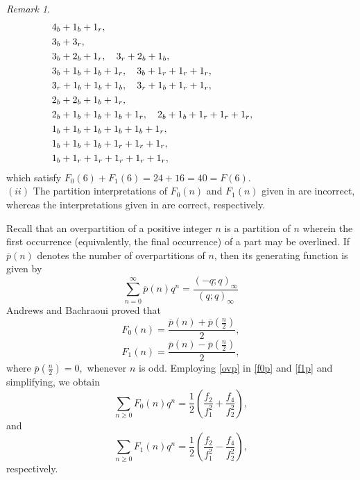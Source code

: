 \documentclass[12pt]{article}
\numberwithin{equation}{section}
\theoremstyle{definition}
\theoremstyle{remark}
\newtheorem{remark}[theorem]{Remark}
\numberwithin{equation}{section}
\begin{document}
\begin{remark}
\begin{align*}
	\hspace{-2.1cm}	&4_b+1_b+1_r,\\
	\hspace{-2.1cm}	&3_b+3_r,\\
	\hspace{-2.1cm}	&3_b+2_b+1_r,\quad 3_r+2_b+1_b,\\
	\hspace{-2.1cm}	&3_b+1_b+1_b+1_r,\quad 3_b+1_r+1_r+1_r,\\
	\hspace{-2.1cm}	&3_r+1_b+1_b+1_b,\quad 3_r+1_b+1_r+1_r, \\
	\hspace{-2.1cm}	&2_b+2_b+1_b+1_r,\\
	\hspace{-2.1cm}	&2_b+1_b+1_b+1_b+1_r,\quad
	2_b+1_b+1_r+1_r+1_r,\\
	\hspace{-2.1cm}	&1_b+1_b+1_b+1_b+1_b+1_r,\\
	\hspace{-2.1cm}	&1_b+1_b+1_b+1_r+1_r+1_r,\\
	\hspace{-2.1cm}	&1_b+1_r+1_r+1_r+1_r+1_r,
\end{align*}
which satisfy $F_0(6)+F_1(6)=24+16=40=F(6)$.\\

\noindent$(ii)$ The partition interpretations of \( F_0(n) \) and \( F_1(n) \) given in \cite[p.2, Corollary 1.4 and 1.6]{2clr} are incorrect, whereas the interpretations given in \cite[Corollary 1 and 2]{arx} are correct, respectively.
\end{remark}

Recall that  an overpartition of a positive integer $n$ is a partition of $n$ wherein  the first occurrence (equivalently, the final occurrence) of a part may be overlined.  If $\overline{p}(n)$ denotes the number of overpartitions of $n$, then its generating function \cite{cor} is given by 
\begin{equation}\label{ovp}
	\sum_{n=0}^{\infty}\overline{p}(n)q^n=\dfrac{(-q;q)_\infty}{(q;q)_\infty}
\end{equation}
Andrews and Bachraoui \cite[p.4, Theorem 2.1]{2clr}  proved that
\begin{equation}\label{f0p}
   F_0(n)=\dfrac{\overline{p}(n)+\overline{p}(\frac{n}{2})}{2},  
\end{equation}
\begin{equation}\label{f1p}
   F_1(n)=\dfrac{\overline{p}(n)-\overline{p}(\frac{n}{2})}{2},  
\end{equation}
where $\overline p(\frac{n}{2})=0,$ whenever $n$ is odd.
Employing \eqref{ovp} in \eqref{f0p} and \eqref{f1p} and simplifying, we obtain
\begin{equation}\label{t3h}
\sum_{n\geq 0}F_0(n)q^n
=
\dfrac{1}{2}\left(\dfrac{f_2}{f_1^2}
+
\dfrac{f_4}{f_2^2}\right),
\end{equation}
and 
\begin{equation}\label{f1t3h} 
   \sum_{n\geq 0}F_1(n)q^n
=
\dfrac{1}{2}\left(\dfrac{f_2}{f_1^2}
-
\dfrac{f_4}{f_2^2}\right),
\end{equation}respectively.
\end{document}
